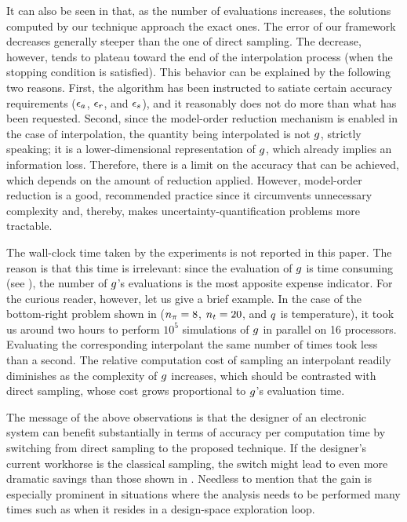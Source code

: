 It can also be seen in  that, as the number of evaluations
increases, the solutions computed by our technique approach the exact ones. The
error of our framework decreases generally steeper than the one of direct
sampling. The decrease, however, tends to plateau toward the end of the
interpolation process (when the stopping condition is satisfied). This behavior
can be explained by the following two reasons. First, the algorithm has been
instructed to satiate certain accuracy requirements ($\epsilon_a$, $\epsilon_r$, and
$\epsilon_s$), and it reasonably does not do more than what has been requested.
Second, since the model-order reduction mechanism is enabled in the case of
interpolation, the quantity being interpolated is not $g$, strictly speaking;
it is a lower-dimensional representation of $g$, which already implies an
information loss. Therefore, there is a limit on the accuracy that can be
achieved, which depends on the amount of reduction applied. However, model-order
reduction is a good, recommended practice since it circumvents unnecessary
complexity and, thereby, makes uncertainty-quantification problems more
tractable.

The wall-clock time taken by the experiments is not reported in this paper. The
reason is that this time is irrelevant: since the evaluation of $g$ is time
consuming (see ), the number of $g$'s evaluations is the most
apposite expense indicator. For the curious reader, however, let us give a brief
example. In the case of the bottom-right problem shown in  (${n_\pi} =
8$, ${n_t} = 20$, and $q$ is temperature), it took us around two hours to perform
$10^5$ simulations of $g$ in parallel on 16 processors. Evaluating the
corresponding interpolant the same number of times took less than a second. The
relative computation cost of sampling an interpolant readily diminishes as the
complexity of $g$ increases, which should be contrasted with direct sampling,
whose cost grows proportional to $g$'s evaluation time.

The message of the above observations is that the designer of an electronic
system can benefit substantially in terms of accuracy per computation time by
switching from direct sampling to the proposed technique. If the designer's
current workhorse is the classical  sampling, the switch might lead to
even more dramatic savings than those shown in . Needless to
mention that the gain is especially prominent in situations where the analysis
needs to be performed many times such as when it resides in a design-space
exploration loop.
